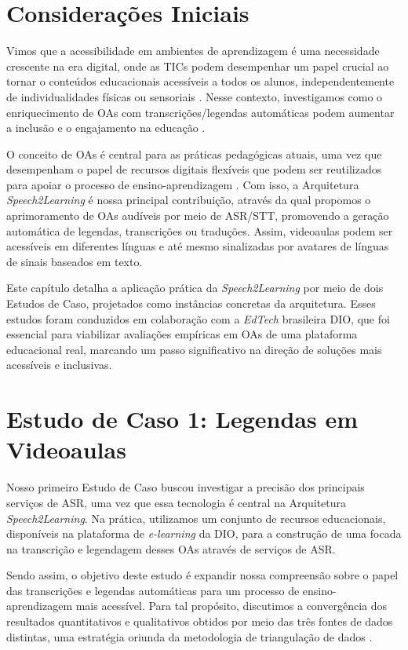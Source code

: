 \section{Considerações Iniciais}

Vimos que a acessibilidade em ambientes de aprendizagem é uma necessidade crescente na era digital, onde as TICs podem desempenhar um papel crucial ao tornar o conteúdos educacionais acessíveis a todos os alunos, independentemente de individualidades físicas ou sensoriais \cite{Mayer2021}. Nesse contexto, investigamos como o enriquecimento de OAs com transcrições/legendas automáticas podem aumentar a inclusão e o engajamento na educação \cite{FalvoJr2023_HICSS,FalvoJr2024_FIE}.

O conceito de OAs é central para as práticas pedagógicas atuais, uma vez que desempenham o papel de recursos digitais flexíveis que podem ser reutilizados para apoiar o processo de ensino-aprendizagem \cite{Parakh2022}. Com isso, a Arquitetura \textit{Speech2Learning} é nossa principal contribuição, através da qual propomos o aprimoramento de OAs audíveis por meio de ASR/STT, promovendo a geração automática de legendas, transcrições ou traduções. Assim, videoaulas podem ser acessíveis em diferentes línguas e até mesmo sinalizadas por avatares de línguas de sinais baseados em texto.

Este capítulo detalha a aplicação prática da \textit{Speech2Learning} por meio de dois Estudos de Caso, projetados como instâncias concretas da arquitetura. Esses estudos foram conduzidos em colaboração com a \textit{EdTech} brasileira DIO, que foi essencial para viabilizar avaliações empíricas em OAs de uma plataforma educacional real, marcando um passo significativo na direção de soluções mais acessíveis e inclusivas.

\section{Estudo de Caso 1: Legendas em Videoaulas}

Nosso primeiro Estudo de Caso buscou investigar a precisão dos principais serviços de ASR, uma vez que essa tecnologia é central na Arquitetura \textit{Speech2Learning}. Na prática, utilizamos um conjunto de recursos educacionais, disponíveis na plataforma de \textit{e-learning} da DIO, para a construção de uma  focada na transcrição e legendagem desses OAs através de serviços de ASR.

Sendo assim, o objetivo deste estudo é expandir nossa compreensão sobre o papel das transcrições e legendas automáticas para um processo de ensino-aprendizagem mais acessível. Para tal propósito, discutimos a convergência dos resultados quantitativos e qualitativos obtidos por meio das três fontes de dados distintas, uma estratégia oriunda da metodologia de triangulação de dados \cite{LimaJunior2021}.

